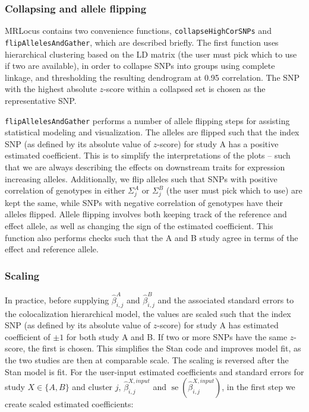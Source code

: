 \documentclass[11pt]{article}
\DeclareMathOperator{\se}{\textrm{se}}
\begin{document}
\subsubsection{Collapsing and allele flipping}

MRLocus contains two convenience functions,
\texttt{collapseHighCorSNPs} and \texttt{flipAllelesAndGather}, which
are described briefly. The first function uses hierarchical clustering
based on the LD matrix (the user must pick which to use if two are
available), in order to collapse SNPs into groups using complete
linkage, and thresholding the resulting dendrogram at 0.95
correlation. The SNP with the highest absolute $z$-score within a
collapsed set is chosen as the representative SNP.

\texttt{flipAllelesAndGather} performs a number of allele flipping
steps for assisting statistical modeling and visualization. The
alleles are flipped such that the index SNP (as defined by its
absolute value of $z$-score) for study A has a positive estimated
coefficient. This is to simplify the interpretations of the plots --
such that we are always describing the effects on downstream traits
for expression increasing alleles. Additionally, we flip alleles such
that SNPs with positive correlation of genotypes in either
$\Sigma_j^A$ or $\Sigma_j^B$ (the user must pick which to use) are
kept the same, while SNPs with negative correlation of genotypes have
their alleles flipped. Allele flipping involves both keeping track of
the reference and effect allele, as well as changing the sign of the
estimated coefficient. This function also performs checks such that
the A and B study agree in terms of the effect and reference allele.

\subsubsection{Scaling}

In practice, before supplying
$\widehat{\beta}^A_{i,j}$ and $\widehat{\beta}^B_{i,j}$
and the associated standard errors to the colocalization hierarchical
model, the values are scaled such that the index SNP (as defined by
its absolute value of $z$-score) for study A has estimated coefficient
of $\pm 1$ for both study A and B. If two or more SNPs have the same
$z$-score, the first is chosen.  This simplifies the Stan code and
improves model fit, as the two studies are then at comparable
scale. The scaling is reversed after the Stan model is fit.  For the
user-input estimated coefficients and standard errors for
study $X \in \{A,B\}$ and cluster $j$,
$\widehat{\beta}^{X,input}_{i,j}$ and $\se(\widehat{\beta}^{X,input}_{i,j})$,
in the first step we create scaled estimated coefficients:
\end{document}
